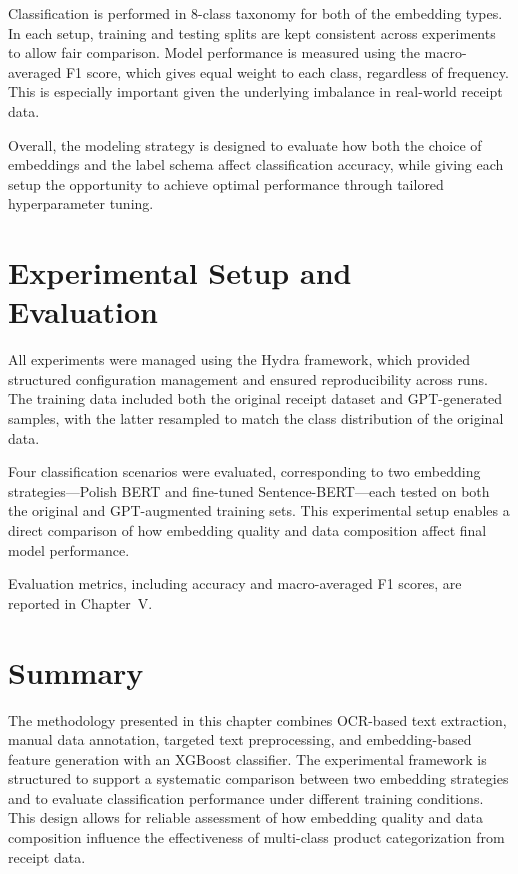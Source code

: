 \documentclass{SGGW-thesis-EN}
\begin{document}
Classification is performed in 8-class taxonomy for both of the embedding types. In each setup, training and testing splits are kept consistent across  
experiments to allow fair comparison. Model performance is measured using the macro-averaged F1 score, which gives equal weight to each class,  
regardless of frequency. This is especially important given the underlying imbalance in real-world receipt data.

Overall, the modeling strategy is designed to evaluate how both the choice of embeddings and the label schema affect classification accuracy,  
while giving each setup the opportunity to achieve optimal performance through tailored hyperparameter tuning.


\section{Experimental Setup and Evaluation}
All experiments were managed using the Hydra framework, which provided structured configuration management and ensured reproducibility across  
runs. The training data included both the original receipt dataset and GPT-generated samples, with the latter resampled to match the class  
distribution of the original data.

Four classification scenarios were evaluated, corresponding to two embedding strategies—Polish BERT and fine-tuned Sentence-BERT—each tested  
on both the original and GPT-augmented training sets. This experimental setup enables a direct comparison of how embedding quality and data  
composition affect final model performance.

Evaluation metrics, including accuracy and macro-averaged F1 scores, are reported in Chapter~V.


\section{Summary}
The methodology presented in this chapter combines OCR-based text extraction, manual data annotation, targeted text preprocessing, and  
embedding-based feature generation with an XGBoost classifier. The experimental framework is structured to support a systematic comparison  
between two embedding strategies and to evaluate classification performance under different training conditions. This design allows for  
reliable assessment of how embedding quality and data composition influence the effectiveness of multi-class product categorization from  
receipt data.
\end{document}

